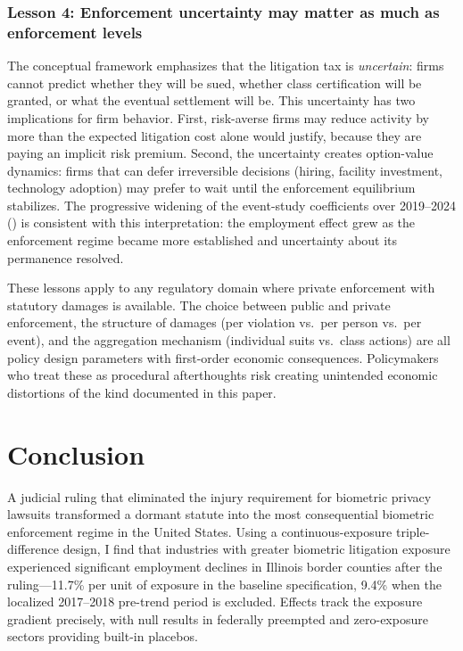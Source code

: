 \documentclass[12pt]{article}
\begin{document}
\subsubsection*{Lesson 4: Enforcement uncertainty may matter as much as enforcement levels} The conceptual framework emphasizes that the litigation tax is \textit{uncertain}: firms cannot predict whether they will be sued, whether class certification will be granted, or what the eventual settlement will be. This uncertainty has two implications for firm behavior. First, risk-averse firms may reduce activity by more than the expected litigation cost alone would justify, because they are paying an implicit risk premium. Second, the uncertainty creates option-value dynamics: firms that can defer irreversible decisions (hiring, facility investment, technology adoption) may prefer to wait until the enforcement equilibrium stabilizes. The progressive widening of the event-study coefficients over 2019--2024 () is consistent with this interpretation: the employment effect grew as the enforcement regime became more established and uncertainty about its permanence resolved.

These lessons apply to any regulatory domain where private enforcement with statutory damages is available. The choice between public and private enforcement, the structure of damages (per violation vs.\ per person vs.\ per event), and the aggregation mechanism (individual suits vs.\ class actions) are all policy design parameters with first-order economic consequences. Policymakers who treat these as procedural afterthoughts risk creating unintended economic distortions of the kind documented in this paper.

\section{Conclusion}
\label{sec:conclusion}

A judicial ruling that eliminated the injury requirement for biometric privacy lawsuits transformed a dormant statute into the most consequential biometric enforcement regime in the United States. Using a continuous-exposure triple-difference design, I find that industries with greater biometric litigation exposure experienced significant employment declines in Illinois border counties after the ruling---11.7\% per unit of exposure in the baseline specification, 9.4\% when the localized 2017--2018 pre-trend period is excluded. Effects track the exposure gradient precisely, with null results in federally preempted and zero-exposure sectors providing built-in placebos.
\end{document}
